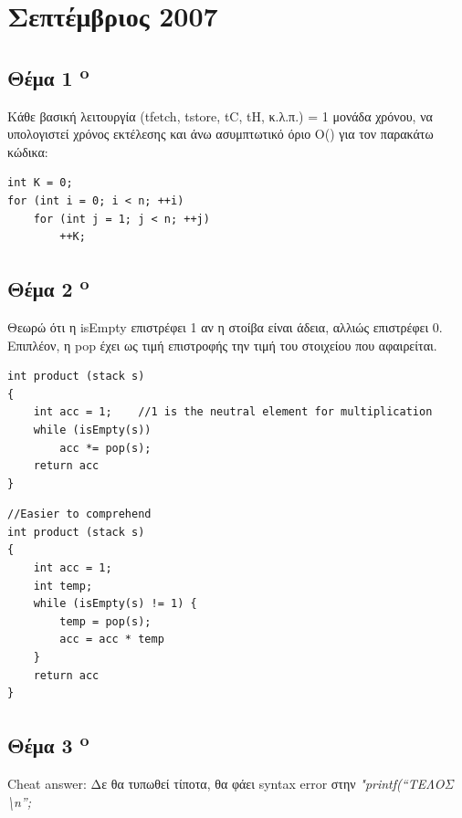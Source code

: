 \documentclass[a4paper,10pt]{article}
\begin{document}
\renewcommand{\labelenumi}{\roman{enumi})}
\renewcommand{\labelenumii}{(\arabic{enumii})}



\section{Σεπτέμβριος 2007}
\setcounter{section}{1}

\subsection{Θέμα 1 \textsuperscript{o}}
Κάθε βασική λειτουργία (tfetch, tstore, tC, tH, κ.λ.π.) = 1 μονάδα χρόνου, να
υπολογιστεί χρόνος εκτέλεσης και άνω ασυμπτωτικό όριο Ο() για τον παρακάτω
κώδικα:

\begin{lstlisting}
int K = 0;
for (int i = 0; i < n; ++i)
	for (int j = 1; j < n; ++j)
		++K;
\end{lstlisting}

\subsection{Θέμα 2 \textsuperscript{o}}
Θεωρώ ότι η isEmpty επιστρέφει 1 αν η στοίβα είναι άδεια, αλλιώς επιστρέφει 0.
Επιπλέον, η pop έχει ως τιμή επιστροφής την τιμή του στοιχείου που αφαιρείται.

\begin{lstlisting}
int product (stack s)
{
	int acc = 1;	//1 is the neutral element for multiplication
	while (isEmpty(s))
		acc *= pop(s);
	return acc
}
\end{lstlisting}

\begin{lstlisting}
//Easier to comprehend
int product (stack s)
{
	int acc = 1;
	int temp;
	while (isEmpty(s) != 1) {
		temp = pop(s);
		acc = acc * temp
	}
	return acc
}

\end{lstlisting}

\subsection{Θέμα 3 \textsuperscript{o}}
Cheat answer:
Δε θα τυπωθεί τίποτα, θα φάει syntax error στην \textit{"printf(“ΤΕΛΟΣ
\textbackslash{}n”;} \\
\end{document}
